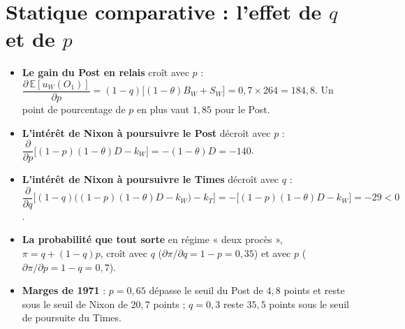 \documentclass[11pt,a4paper]{article}
\theoremstyle{definition}
\newcommand{\E}{\mathbb{E}}
\begin{document}
\section{Statique comparative : l'effet de $q$ et de $p$}
\begin{itemize}[leftmargin=*,itemsep=3pt]
\item \textbf{Le gain du Post en relais} croît avec $p$ : $\dfrac{\partial\,\E[u_W(O_1)]}{\partial p}=(1-q)\big[(1-\theta)B_W+S_W\big]=0,7\times264=184,8$. Un point de pourcentage de $p$ en plus vaut $1,85$ pour le Post.
\item \textbf{L'intérêt de Nixon à poursuivre le Post} décroît avec $p$ : $\dfrac{\partial}{\partial p}\big[(1-p)(1-\theta)D-k_W\big]=-(1-\theta)D=-140$.
\item \textbf{L'intérêt de Nixon à poursuivre le Times} décroît avec $q$ : $\dfrac{\partial}{\partial q}\big[(1-q)\big((1-p)(1-\theta)D-k_W\big)-k_T\big]=-\big[(1-p)(1-\theta)D-k_W\big]=-29<0$.
\item \textbf{La probabilité que tout sorte} en régime « deux procès », $\pi=q+(1-q)p$, croît avec $q$ ($\partial\pi/\partial q=1-p=0,35$) et avec $p$ ($\partial\pi/\partial p=1-q=0,7$).
\item \textbf{Marges de 1971} : $p=0,65$ dépasse le seuil du Post de $4,8$ points et reste sous le seuil de Nixon de $20,7$ points ; $q=0,3$ reste $35,5$ points sous le seuil de poursuite du Times.
\end{itemize}
\end{document}
